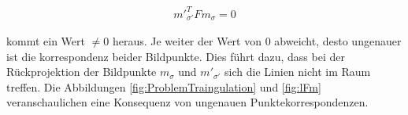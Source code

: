 \begin{gather}
	m'^T_{\sigma'}Fm_\sigma = 0
\end{gather}

kommt ein Wert $\neq 0$ heraus. Je weiter der Wert von 0 abweicht, desto ungenauer ist die korrespondenz beider Bildpunkte. Dies führt dazu, dass bei der Rückprojektion der Bildpunkte $m_\sigma$ und $m'_{\sigma'}$ sich die Linien nicht im Raum treffen. Die Abbildungen \ref{fig:ProblemTraingulation} und \ref{fig:lFm} veranschaulichen eine Konsequenz von ungenauen Punktekorrespondenzen.
%
%
%
%

